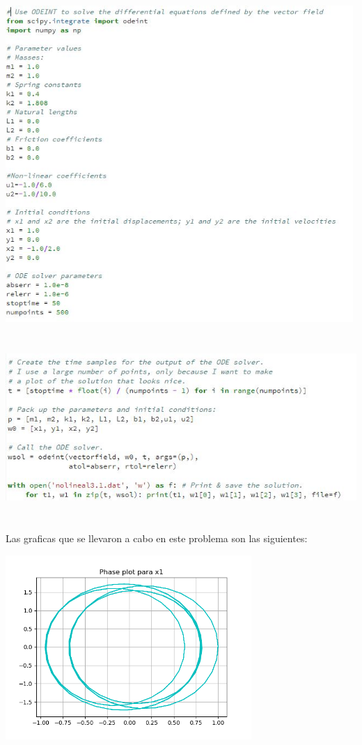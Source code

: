 \documentclass{article}
\begin{document}
\begin{center}
\includegraphics[height=12cm]{cod8.png}
\end{center}
\begin{center}
\includegraphics[height=7cm]{cod9.png}
\end{center}

Las graficas que se llevaron a cabo en este problema son las siguientes:

\begin{center}
\includegraphics[height=7cm]{nolineal3_1_1.png}
\end{center}
\end{document}
